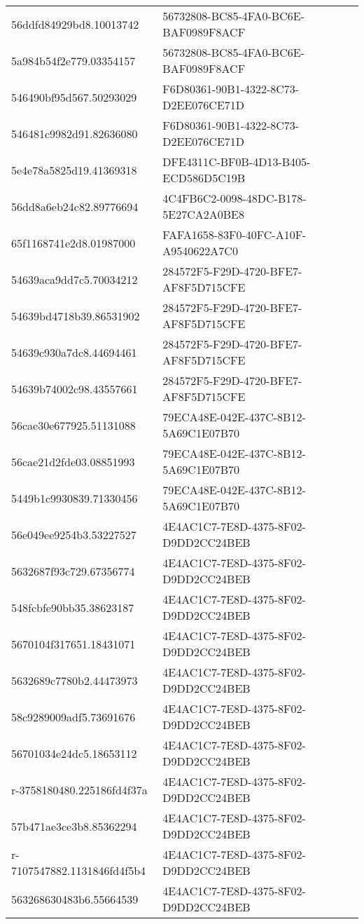 \begin{tabular}{ll}
56ddfd84929bd8.10013742 & 56732808-BC85-4FA0-BC6E-BAF0989F8ACF \\
5a984b54f2e779.03354157 & 56732808-BC85-4FA0-BC6E-BAF0989F8ACF \\
546490bf95d567.50293029 & F6D80361-90B1-4322-8C73-D2EE076CE71D \\
546481c9982d91.82636080 & F6D80361-90B1-4322-8C73-D2EE076CE71D \\
5e4e78a5825d19.41369318 & DFE4311C-BF0B-4D13-B405-ECD586D5C19B \\
56dd8a6eb24c82.89776694 & 4C4FB6C2-0098-48DC-B178-5E27CA2A0BE8 \\
65f1168741e2d8.01987000 & FAFA1658-83F0-40FC-A10F-A9540622A7C0 \\
54639aca9dd7c5.70034212 & 284572F5-F29D-4720-BFE7-AF8F5D715CFE \\
54639bd4718b39.86531902 & 284572F5-F29D-4720-BFE7-AF8F5D715CFE \\
54639c930a7dc8.44694461 & 284572F5-F29D-4720-BFE7-AF8F5D715CFE \\
54639b74002c98.43557661 & 284572F5-F29D-4720-BFE7-AF8F5D715CFE \\
56cae30e677925.51131088 & 79ECA48E-042E-437C-8B12-5A69C1E07B70 \\
56cae21d2fde03.08851993 & 79ECA48E-042E-437C-8B12-5A69C1E07B70 \\
5449b1c9930839.71330456 & 79ECA48E-042E-437C-8B12-5A69C1E07B70 \\
56e049ee9254b3.53227527 & 4E4AC1C7-7E8D-4375-8F02-D9DD2CC24BEB \\
5632687f93c729.67356774 & 4E4AC1C7-7E8D-4375-8F02-D9DD2CC24BEB \\
548fcbfe90bb35.38623187 & 4E4AC1C7-7E8D-4375-8F02-D9DD2CC24BEB \\
5670104f317651.18431071 & 4E4AC1C7-7E8D-4375-8F02-D9DD2CC24BEB \\
5632689c7780b2.44473973 & 4E4AC1C7-7E8D-4375-8F02-D9DD2CC24BEB \\
58c9289009adf5.73691676 & 4E4AC1C7-7E8D-4375-8F02-D9DD2CC24BEB \\
56701034e24dc5.18653112 & 4E4AC1C7-7E8D-4375-8F02-D9DD2CC24BEB \\
r-3758180480.225186fd4f37a & 4E4AC1C7-7E8D-4375-8F02-D9DD2CC24BEB \\
57b471ae3ce3b8.85362294 & 4E4AC1C7-7E8D-4375-8F02-D9DD2CC24BEB \\
r-7107547882.1131846fd4f5b4 & 4E4AC1C7-7E8D-4375-8F02-D9DD2CC24BEB \\
563268630483b6.55664539 & 4E4AC1C7-7E8D-4375-8F02-D9DD2CC24BEB \\

\end{tabular}
